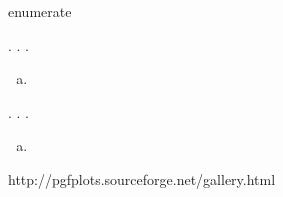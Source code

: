 enumerate
\usepackage[shortlabels]{enumerate}
.
.
.
\begin{enumerate}[(a)] %
\item
\end{enumerate}
.
.
.
\begin{enumerate}[a)] %
\item
\end{enumerate}


http://pgfplots.sourceforge.net/gallery.html